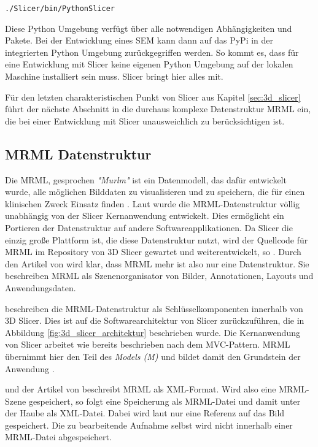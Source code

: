 \begin{center}
	\texttt{./Slicer/bin/PythonSlicer}
\end{center}

Diese Python Umgebung verfügt über alle notwendigen Abhängigkeiten und Pakete. Bei
der Entwicklung eines \ac{SEM} kann dann auf das \ac{PyPi} in der integrierten Python
Umgebung zurückgegriffen werden. So kommt es, dass für eine Entwicklung mit Slicer
keine eigenen Python Umgebung auf der lokalen Maschine installiert sein muss.
Slicer bringt hier alles mit.

Für den letzten charakteristischen Punkt von Slicer aus Kapitel
\ref{sec:3d_slicer} führt der nächste Abschnitt in die durchaus komplexe
Datenstruktur \ac{MRML} ein, die bei einer Entwicklung mit Slicer unausweichlich
zu berücksichtigen ist.

\subsection{MRML Datenstruktur}
\label{subsec:mrml_datenstruktur} Die \ac{MRML}, gesprochen \textit{"Murlm"} ist
ein Datenmodell, das dafür entwickelt wurde, alle möglichen Bilddaten zu visualisieren
und zu speichern, die für einen klinischen Zweck Einsatz finden \citep[vgl.][]{slicer2024}.
Laut \citet{slicer2024} wurde die \ac{MRML}-Datenstruktur völlig unabhängig von
der Slicer Kernanwendung entwickelt. Dies ermöglicht ein Portieren der Datenstruktur
auf andere Softwareapplikationen. Da Slicer die einzig große Plattform ist, die diese
Datenstruktur nutzt, wird der Quellcode für \ac{MRML} im Repository von 3D Slicer
gewartet und weiterentwickelt, so \citet{slicer2024}. Durch den Artikel von
\citet[S.1]{fedorov2012slicer} wird klar, dass \ac{MRML} mehr ist also nur eine Datenstruktur.
Sie beschreiben \ac{MRML} als Szenenorganisator von Bilder, Annotationen, Layouts
und Anwendungsdaten.

\citet[S.~11]{fedorov2012slicer} beschreiben die \ac{MRML}-Datenstruktur als Schlüsselkomponenten
innerhalb von 3D Slicer. Dies ist auf die Softwarearchitektur von Slicer
zurückzuführen, die in Abbildung \ref{fig:3d_slicer_architektur} beschrieben wurde.
Die Kernanwendung von Slicer arbeitet wie bereits beschrieben nach dem \ac{MVC}-Pattern.
\ac{MRML} übernimmt hier den Teil des \textit{Models (M)} und bildet damit den
Grundstein der Anwendung \citep[vgl.][S.~25]{fedorov2012slicer}.

\citet{slicer2024} und der Artikel von \citet[S.~11]{fedorov2012slicer} beschreibt
\ac{MRML} als \ac{XML}-Format. Wird also eine \ac{MRML}-Szene gespeichert, so
folgt eine Speicherung als \ac{MRML}-Datei und damit unter der Haube als \ac{XML}-Datei.
Dabei wird laut \citet{slicer2024} nur eine Referenz auf das Bild gespeichert. Die
zu bearbeitende Aufnahme selbst wird nicht innerhalb einer \ac{MRML}-Datei
abgespeichert.

